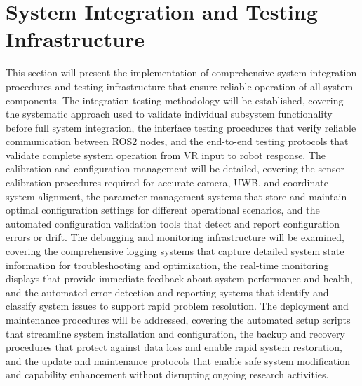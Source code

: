 \section{System Integration and Testing Infrastructure}
This section will present the implementation of comprehensive system integration procedures and testing infrastructure that ensure reliable operation of all system components. The integration testing methodology will be established, covering the systematic approach used to validate individual subsystem functionality before full system integration, the interface testing procedures that verify reliable communication between ROS2 nodes, and the end-to-end testing protocols that validate complete system operation from VR input to robot response. The calibration and configuration management will be detailed, covering the sensor calibration procedures required for accurate camera, UWB, and coordinate system alignment, the parameter management systems that store and maintain optimal configuration settings for different operational scenarios, and the automated configuration validation tools that detect and report configuration errors or drift. The debugging and monitoring infrastructure will be examined, covering the comprehensive logging systems that capture detailed system state information for troubleshooting and optimization, the real-time monitoring displays that provide immediate feedback about system performance and health, and the automated error detection and reporting systems that identify and classify system issues to support rapid problem resolution. The deployment and maintenance procedures will be addressed, covering the automated setup scripts that streamline system installation and configuration, the backup and recovery procedures that protect against data loss and enable rapid system restoration, and the update and maintenance protocols that enable safe system modification and capability enhancement without disrupting ongoing research activities.
